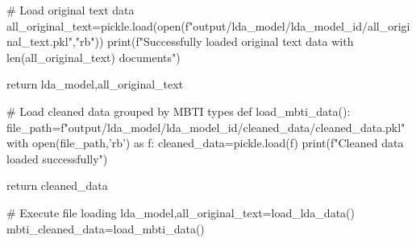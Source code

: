 \documentclass[12pt]{article}
\begin{document}
\begin{python}
    # Load original text data
    all_original_text=pickle.load(open(f"output/lda_model/lda_{model_id}/all_original_text.pkl","rb"))
    print(f"Successfully loaded original text data with {len(all_original_text)} documents")
    
    return lda_model,all_original_text
    

# Load cleaned data grouped by MBTI types
def load_mbti_data():
    file_path=f"output/lda_model/lda_{model_id}/cleaned_data/cleaned_data.pkl"
    with open(file_path,'rb') as f:
        cleaned_data=pickle.load(f)
    print(f"Cleaned data loaded successfully")

    return cleaned_data

# Execute file loading
lda_model,all_original_text=load_lda_data()
mbti_cleaned_data=load_mbti_data()
		\end{python}
	
\end{document}
